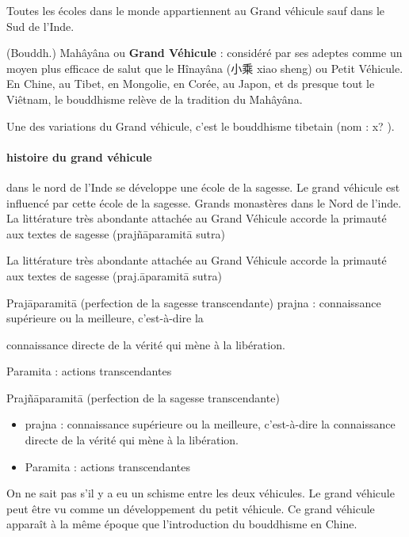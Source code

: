 Toutes les écoles dans le monde appartiennent au Grand véhicule sauf dans le Sud de l'Inde. 

\begin{Def}[dasheng 大乘]
    (Bouddh.) Mahâyâna ou \textbf{Grand Véhicule} : considéré par ses adeptes comme un moyen plus efficace de salut que le Hînayâna (小乘 xiao sheng) ou Petit Véhicule. En Chine, au Tibet, en Mongolie, en Corée, au Japon, et ds presque tout le Viêtnam, le bouddhisme relève de la tradition du Mahâyâna.

    Une des variations du Grand véhicule, c'est le bouddhisme tibetain (nom : x? ).
\end{Def}

\paragraph{histoire du grand véhicule} dans le nord de l'Inde se développe une école de la sagesse. Le grand véhicule est influencé par cette école de la sagesse. Grands monastères dans le Nord de l'inde.
La littérature très abondante attachée au Grand Véhicule accorde la primauté aux textes de sagesse (prajñāparamitā sutra)
{La littérature très abondante attachée au Grand Véhicule accorde la primauté aux textes de sagesse (praj.āparamitā sutra)

{Prajāparamitā (perfection de la sagesse transcendante)}
{ prajna : connaissance supérieure ou la meilleure, c’est-à-dire la}

{connaissance directe de la vérité qui mène à la libération.}

{Paramita : actions transcendantes}
}
\begin{Def}[Prajñāparamitā]
    Prajñāparamitā (perfection de la sagesse transcendante)

    \begin{itemize}
        \item  	prajna : connaissance supérieure ou la meilleure, c’est-à-dire la connaissance directe de la vérité qui mène à la libération.
\item 	Paramita : actions transcendantes
    \end{itemize}

\end{Def}

On ne sait pas s'il y a eu un schisme entre les deux véhicules. Le grand véhicule peut être vu comme un développement du petit véhicule.
Ce grand véhicule apparaît à la même époque que l'introduction du bouddhisme en Chine. 


